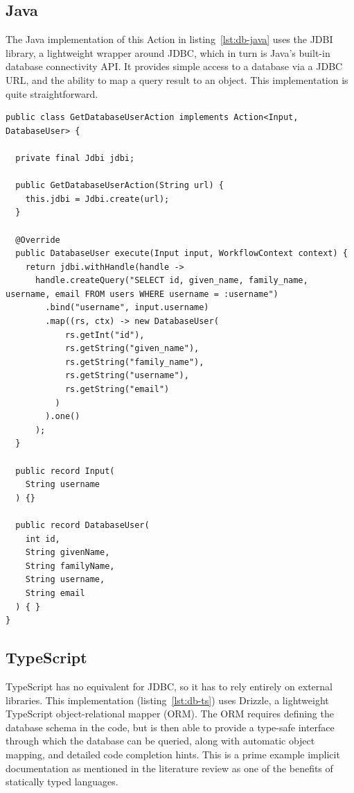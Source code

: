 \subsection{Java}
The Java implementation of this Action in listing~\ref{lst:db-java} uses the JDBI library, a lightweight wrapper around JDBC, which in turn is Java's built-in database connectivity API. It provides simple access to a database via a JDBC URL, and the ability to map a query result to an object. This implementation is quite straightforward.
\begin{listing}[H]
    \begin{verbatim}
public class GetDatabaseUserAction implements Action<Input, DatabaseUser> {
            
  private final Jdbi jdbi;
            
  public GetDatabaseUserAction(String url) {
    this.jdbi = Jdbi.create(url);
  }
            
  @Override
  public DatabaseUser execute(Input input, WorkflowContext context) {
    return jdbi.withHandle(handle ->
      handle.createQuery("SELECT id, given_name, family_name, username, email FROM users WHERE username = :username")
        .bind("username", input.username)
        .map((rs, ctx) -> new DatabaseUser(
            rs.getInt("id"),
            rs.getString("given_name"),
            rs.getString("family_name"),
            rs.getString("username"),
            rs.getString("email")
          )
        ).one()
      );
  }
            
  public record Input(
    String username
  ) {}
            
  public record DatabaseUser(
    int id,
    String givenName,
    String familyName,
    String username,
    String email
  ) { }
}
    \end{verbatim}
    \caption{\label{lst:db-java}Database query action in Java}
\end{listing}

\subsection{TypeScript}
TypeScript has no equivalent for JDBC, so it has to rely entirely on external libraries. This implementation (listing~\ref{lst:db-ts}) uses Drizzle, a lightweight TypeScript object-relational mapper (ORM). The ORM requires defining the database schema in the code, but is then able to provide a type-safe interface through which the database can be queried, along with automatic object mapping, and detailed code completion hints. This is a prime example implicit documentation as mentioned in the literature review as one of the benefits of statically typed languages. 

